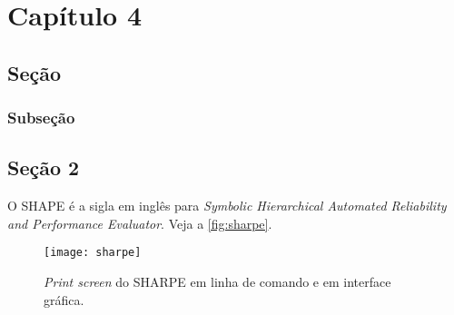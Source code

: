 \chapter[Capítulo 4]{Capítulo 4}
\label{ch:cap4}
\lipsum[3-5]

\section{Seção}

\lipsum[1-2]

\subsection{Subseção}
\lipsum[3-5]

\section{Seção 2}\label{secao2}

O SHAPE é a sigla em inglês para \textit{Symbolic Hierarchical Automated Reliability and Performance Evaluator}. Veja a  \autoref{fig:sharpe}.

\begin{figure}[!h]
	\texttt{[image: sharpe]}
	\centering
	\caption[\textit{Print screen} do SHARPE em linha de comando e em interface gráfica.]{\textit{Print screen} do SHARPE em linha de comando e em interface gráfica.}
	\label{fig:sharpe}
\end{figure}